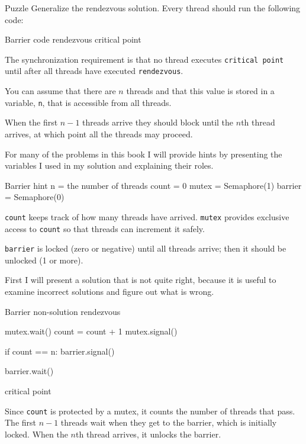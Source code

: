 \begin{puzzlebox}{Puzzle}
Generalize the rendezvous solution.  Every thread should
run the following code:

\begin{lstbox}{Barrier code}
rendezvous
critical point
\end{lstbox}

The synchronization requirement is that
no thread executes {\tt critical point} until after all
threads have executed {\tt rendezvous}.

You can assume that there are $n$
threads and that this value is stored in a variable, {\tt n},
that is accessible from all threads.

When the first $n-1$ threads arrive they should block until the $n$th
thread arrives, at which point all the threads may proceed.



For many of the problems in this book I will provide hints
by presenting the variables I used in my solution and
explaining their roles.

\begin{lstbox}{Barrier hint}
n = the number of threads
count = 0
mutex = Semaphore(1)
barrier = Semaphore(0)
\end{lstbox}

{\tt count} keeps track of how many threads have arrived.
{\tt mutex} provides exclusive access to {\tt count} so that
threads can increment it safely.

{\tt barrier} is locked
(zero or negative) until all threads arrive; then it should
be unlocked (1 or more).
\end{puzzlebox}



First I will present a solution that is not quite right, because
it is useful to examine incorrect solutions and figure out what
is wrong.

\begin{lstbox}{Barrier non-solution}
rendezvous

mutex.wait()
    count = count + 1
mutex.signal()

if count == n: barrier.signal()

barrier.wait()

critical point
\end{lstbox}

Since {\tt count} is protected by a mutex, it counts the number of
threads that pass.  The first $n-1$ threads wait when they get to the
barrier, which is initially locked.  When the $n$th thread arrives, it
unlocks the barrier.

